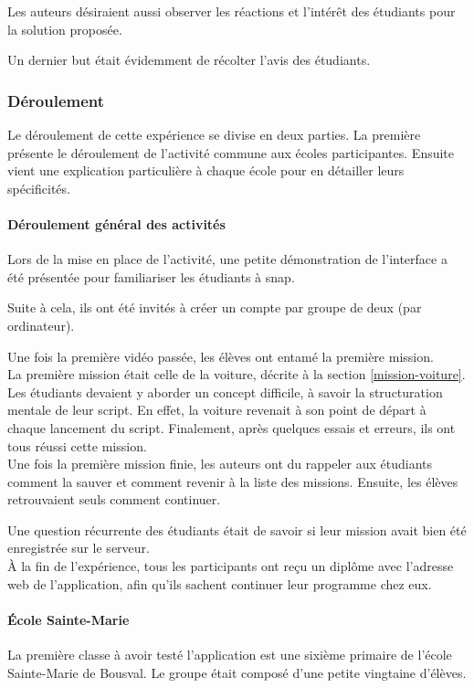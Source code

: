 Les auteurs désiraient aussi observer les réactions et l'intérêt des étudiants pour la solution proposée.

Un dernier but était évidemment de récolter l'avis des étudiants.

\subsubsection{Déroulement}
Le déroulement de cette expérience se divise en deux parties. La première présente le déroulement de l'activité commune aux écoles participantes. Ensuite vient une explication particulière à chaque école pour en détailler leurs spécificités.
\paragraph{Déroulement général des activités}
Lors de la mise en place de l'activité, une petite démonstration de l'interface a été présentée pour familiariser les étudiants à \gls{snap}.

Suite à cela, ils ont été invités à créer un compte par groupe de deux (par ordinateur).

Une fois la première vidéo passée, les élèves ont entamé la première \gls{mission}.\\

La première \gls{mission} était celle de la voiture, décrite à la section \ref{mission-voiture}. Les étudiants devaient y aborder un concept difficile, à savoir la structuration mentale de leur \gls{script}. En effet, la voiture revenait à son point de départ à chaque lancement du \gls{script}. Finalement, après quelques essais et erreurs, ils ont tous réussi cette \gls{mission}.\\

Une fois la première \gls{mission} finie, les auteurs ont du rappeler aux étudiants comment la sauver et comment revenir à la liste des \glspl{mission}. Ensuite, les élèves retrouvaient seuls comment continuer.

Une question récurrente des étudiants était de savoir si leur \gls{mission} avait bien été enregistrée sur le serveur.\\

À la fin de l'expérience, tous les participants ont reçu un diplôme avec l'adresse web de l'application, afin qu'ils sachent continuer leur programme chez eux.

\paragraph{École Sainte-Marie}
La première classe à avoir testé l'application est une sixième \gls{primaire} de l'école Sainte-Marie de Bousval. Le groupe était composé d'une petite vingtaine d'élèves.

